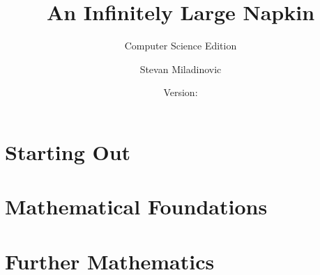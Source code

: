 \documentclass[11pt,twoside=semi,openright,numbers=noenddot,titlepage=false]{scrbook}
\title{An Infinitely Large Napkin}
\subtitle{Computer Science Edition}
\author{Stevan Miladinovic}
\date{Version: \napkinversion}
\begin{document}
\frontmatter
\maketitle

\bgroup{}
\fboxrule=4pt
\egroup{}
\newpage



\setcounter{chapter}{-1} %


\cleardoublepage{}
\setcounter{temppage}{\value{page}}
\mainmatter{}
\setcounter{page}{\value{temppage}}

\tableofcontents


\part{Starting Out}\label{part:startout}
\parttoc{}
\setcounter{chapter}{-1} %


\part{Mathematical Foundations}\label{part:foundations}
\parttoc{}

% 
% 

% 
% 
% 

\part{Further Mathematics}\label{part:maths}
\parttoc{}
% 
% 
%  
%  
%  
%  
%  
%  
%  
% 
% 
%  
%  
%  
%  
%  
% 
% 
% 
\end{document}
